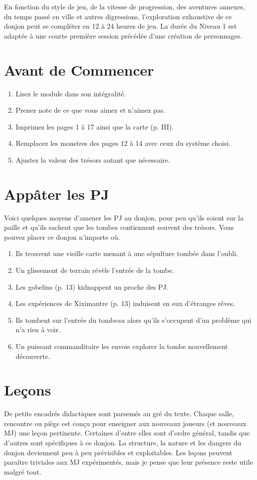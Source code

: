 En fonction du style de jeu, de la vitesse de progression, des aventures annexes, du temps passé en ville et autres digressions, l'exploration exhaustive de ce donjon peut se compléter en 12 à 24 heures de jeu.
La durée du Niveau 1 est adaptée à une courte première session précédée d'une création de personnages.

\section{Avant de Commencer}
\begin{enumerate}
  \item Lisez le module dans son intégralité.
  \item Prenez note de ce que vous aimez et n'aimez pas.
  \item Imprimez les pages 1 à 17 ainsi que la carte (p. III).
  \item Remplacez les monstres des pages 12 à 14 avec ceux du système choisi.
  \item Ajustez la valeur des trésors autant que nécessaire.
\end{enumerate}

\section{Appâter les PJ}
Voici quelques moyens d'amener les PJ au donjon, pour peu qu'ils soient sur la paille et qu'ils sachent que les tombes
contiennent souvent des trésors.
Vous pouvez placer ce donjon n'importe où.

\begin{enumerate}
  \item Ils trouvent une vieille carte menant à une sépulture tombée dans l'oubli.
  \item Un glissement de terrain révèle l'entrée de la tombe.
  \item Les gobelins (p. 13) kidnappent un proche des PJ.
  \item Les expériences de Xiximantre (p. 13) induisent en eux d'étranges rêves.
  \item Ils tombent sur l'entrée du tombeau alors qu'ils s'occupent d'un problème qui n'a rien à voir.
  \item Un puissant commanditaire les envoie explorer la tombe nouvellement découverte.
\end{enumerate}

\section{Leçons}
De petits encadrés didactiques sont parsemés au gré du texte.
Chaque salle, rencontre ou piège est conçu pour enseigner aux nouveaux joueurs (et nouveaux MJ) une leçon pertinente. Certaines d'entre elles sont d'ordre général, tandis que d'autres sont spécifiques à ce donjon.
La structure, la nature et les dangers du donjon deviennent peu à peu prévisibles et exploitables.
Les leçons peuvent paraître triviales aux MJ expérimentés, mais je pense que leur présence reste utile malgré
tout.

